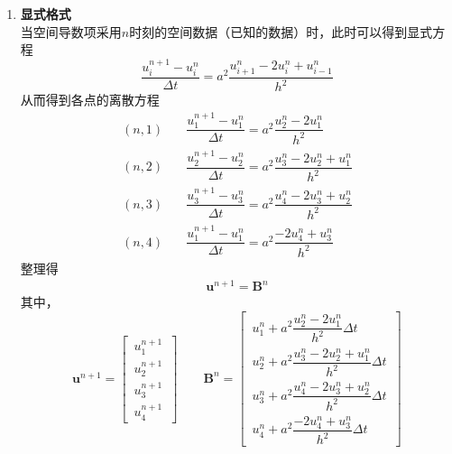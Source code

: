 \begin{enumerate}[\hspace*{2em} (1) ]
	\item \textbf{显式格式}\\
	当空间导数项采用$n$时刻的空间数据（已知的数据）时，此时可以得到显式方程
	\begin{equation}
		\dfrac{u_i^{n+1}-u_i^n}{\Delta t} = a^2 \dfrac{u_{i+1}^n - 2u_i^n + u_{i-1}^n}{h^2}
	\end{equation}
	从而得到各点的离散方程
	\begin{align*}
		(n,1)\quad &\dfrac{u_1^{n+1}-u_1^n}{\Delta t} = a^2 \dfrac{u_{2}^n - 2u_1^n }{h^2}\\[0.5em]
		(n,2)\quad &\dfrac{u_2^{n+1}-u_2^n}{\Delta t} = a^2 \dfrac{u_{3}^n - 2u_2^n + u_1^n}{h^2}\\[0.5em]
		(n,3)\quad &\dfrac{u_3^{n+1}-u_3^n}{\Delta t} = a^2 \dfrac{u_{4}^n - 2u_3^n + u_2^n}{h^2}\\[0.5em]
		(n,4)\quad &\dfrac{u_1^{n+1}-u_1^n}{\Delta t} = a^2 \dfrac{- 2u_4^n + u_3^n}{h^2}
	\end{align*}
	整理得
	\begin{align}
		\bm{u}^{n+1} = \bm{B}^n
	\end{align}
	其中，
	\begin{equation}
		\bm{u}^{n+1} = 
		\begin{bmatrix}
			\, u_1^{n+1}\, \\
			\, u_2^{n+1}\, \\
			\, u_3^{n+1}\, \\
			\, u_4^{n+1}\,
		\end{bmatrix}
	\quad \quad
	\bm{B}^n = 
	\begin{bmatrix}
		\, u_1^n + a^2 \dfrac{u_{2}^n - 2u_1^n }{h^2}\Delta t \,\\[1em]
		\, u_2^n + a^2 \dfrac{u_{3}^n - 2u_2^n + u_1^n}{h^2} \Delta t \, \\[1em]
		\, u_3^n+a^2 \dfrac{u_{4}^n - 2u_3^n + u_2^n}{h^2}\Delta t \, \\[1em]
		\, u_4^n +a^2 \dfrac{- 2u_4^n + u_3^n}{h^2} \Delta t \, 
	\end{bmatrix}
	\end{equation}
	\vspace*{0.5em}
	

\end{enumerate}

